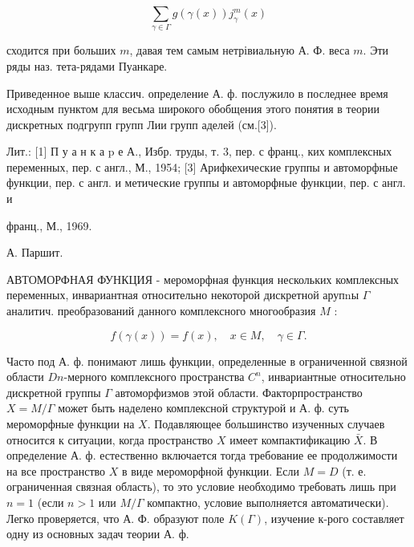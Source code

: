 \documentclass[10pt]{article}
\begin{document}
\[

\sum_{\gamma \in \Gamma} g(\gamma(x)) j_{\gamma}^{m}(x)

\]



сходится при больших $m$, давая тем самым нетрівиальную А. Ф. веса $m$. Эти ряды наз. тета-рядами Пуанкаре.



Приведенное выше классич. определение А. ф. послужило в последнее время исходным пунктом для весьма широкого обобщения этого понятия в теории дискретных подгрупп групп Лии групп аделей (см.[3]).



Лит.: [1] П у а н к а p е А., Избр. труды, т. 3, пер. с франц., ких комплексных переменных, пер. с англ., М., 1954; [3] Арифкехические группы и автоморфные функции, пер. с англ. и метические группы и автоморфные функции, пер. с англ. и

франц., М., 1969.

А. Паршит.



АВТОМОРФНАЯ ФУНКЦИЯ - мероморфная функция нескольких комплексных переменных, инвариантная относительно некоторой дискретной арупnы $\Gamma$ аналитич. преобразований данного комплексного многообразия $M$ :



\[

f(\gamma(x))=f(x), \quad x \in M, \quad \gamma \in \Gamma .

\]



Часто под А. ф. понимают лишь функции, определенные в ограниченной связной области $D n$-мерного комплексного пространства $C^{n}$, инвариантные относительно дискретной группы $\Gamma$ автоморфизмов этой области. Факторпространство $X=M / \Gamma$ может быть наделено комплексной структурой и А. ф. суть мероморфные функции на $X$. Подавляющее большинство изученных случаев относится к ситуации, когда пространство $X$ имеет компактификацию $\bar{X}$. В определение А. ф. естественно включается тогда требование ее продолжимости на все пространство $X$ в виде мероморфной функции. Если $M=D$ (т. е. ограниченная связная область), то это условие необходимо требовать лишь при $n=1$ (если $n>1$ или $M / \Gamma$ компактно, условие выполняется автоматически). Легко проверяется, что А. Ф. образуют поле $K(\Gamma)$, изучение к-рого составляет одну из основных задач теории А. ф.
\end{document}
